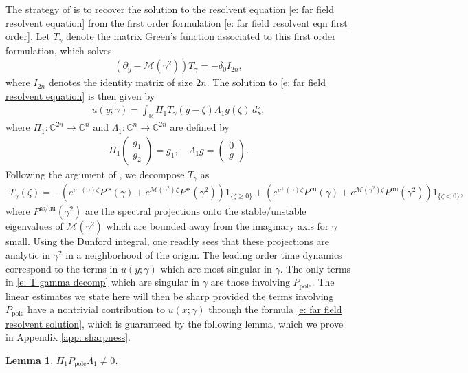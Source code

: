 \documentclass[11pt]{article}
\newcommand{\R}{\mathbb{R}}
\newcommand{\C}{\mathbb{C}}
\newtheorem{lemma}[prop]{Lemma}
\numberwithin{equation}{section}
\numberwithin{prop}{section}
\begin{document}
The strategy of \cite[Section 2]{SIMA} is to recover the solution to the resolvent equation \eqref{e: far field resolvent equation} from the first order formulation \eqref{e: far field resolvent eqn first order}. Let $T_\gamma$ denote the matrix Green's function associated to this first order formulation, which solves
\begin{align}
	(\partial_y - \mathcal{M}(\gamma^2)) T_\gamma = - \delta_0 I_{2n},
\end{align}
where $I_{2n}$ denotes the identity matrix of size $2n$. The solution to \eqref{e: far field resolvent equation} is then given by
\begin{align}
u(y;\gamma) = \int_\R \Pi_1 T_\gamma(y-\zeta) \Lambda_1 g(\zeta) \, d \zeta, \label{e: far field resolvent solution}
\end{align}
where $\Pi_1 : \C^{2n} \to \C^n$ and $\Lambda_1 : \C^n \to \C^{2n}$ are defined by 
\begin{align}
	\Pi_1 \begin{pmatrix}
	g_1 \\ g_2 
	\end{pmatrix} = g_1,
	\quad 
	\Lambda_1 g = \begin{pmatrix} 0 \\ g \end{pmatrix}. 
\end{align}
Following the argument of \cite[Section 2]{SIMA}, we decompose $T_\gamma$ as
\begin{align}
	T_\gamma(\zeta) = -\left( e^{\nu^-(\gamma) \zeta} P^\mathrm{cs}(\gamma) + e^{\mathcal{M}(\gamma^2) \zeta} P^\mathrm{ss}(\gamma^2) \right) 1_{\{\zeta \geq 0\}} + \left( e^{\nu^+(\gamma) \zeta} P^\mathrm{cu}(\gamma) + e^{\mathcal{M}(\gamma^2) \zeta} P^\mathrm{uu}(\gamma^2) \right) 1_{\{\zeta < 0\}}, \label{e: T gamma decomp}
\end{align}
where $P^\mathrm{ss/uu}(\gamma^2)$ are the spectral projections onto the stable/unstable eigenvalues of $\mathcal{M}(\gamma^2)$ which are bounded away from the imaginary axis for $\gamma$ small. Using the Dunford integral, one readily sees that these projections are analytic in $\gamma^2$ in a neighborhood of the origin. The leading order time dynamics correspond to the terms in $u(y;\gamma)$ which are most singular in $\gamma$. The only terms in \eqref{e: T gamma decomp} which are singular in $\gamma$ are those involving $P_\mathrm{pole}$. The linear estimates we state here will then be sharp provided the terms involving $P_\mathrm{pole}$ have a nontrivial contribution to $u(x;\gamma)$ through the formula \eqref{e: far field resolvent solution}, which is guaranteed by the following lemma, which we prove in Appendix \ref{app: sharpness}.
\begin{lemma}\label{l: sharpness}
	$\Pi_1 P_\mathrm{pole} \Lambda_1 \neq 0 $. 
\end{lemma}
\end{document}
